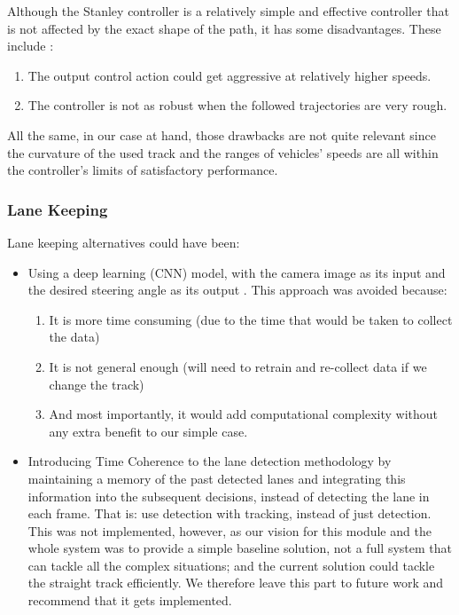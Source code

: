 Although the Stanley controller is a relatively simple and effective controller that is not affected by the exact shape of the path, it has some disadvantages. These include \cite{article}:
\begin{enumerate}
    \item The output control action could get aggressive at relatively higher speeds.
        
    \item The controller is not as robust when the followed trajectories are very rough.
\end{enumerate}

All the same, in our case at hand, those drawbacks are not quite relevant since the curvature of the used track and the ranges of vehicles’ speeds are all within the controller’s limits of satisfactory performance.

\subsubsection{Lane Keeping}
\label{des_lane_keep}
Lane keeping alternatives could have been:

\begin{itemize}
    \item Using a deep learning (CNN) model, with the camera image as its input and the desired steering angle as its output \cite{lane_Deep}. This approach was avoided because:
    \begin{enumerate}
        \item It is more time consuming (due to the time that would be taken to collect the data)
        \item It is not general enough (will need to retrain and re-collect data if we change the track)
        \item And most importantly, it would add computational complexity without any extra benefit to our simple case.
    \end{enumerate}
    
    \item Introducing Time Coherence to the lane detection methodology by maintaining a memory of the past detected lanes and integrating this information into the subsequent decisions, instead of detecting the lane in each frame. That is: use detection with tracking, instead of just detection.\\ This was not implemented, however, as our vision for this module and the whole system was to provide a simple baseline solution, not a full system that can tackle all the complex situations; and the current solution could tackle the straight track efficiently. We therefore leave this part to future work and recommend that it gets implemented.

\end{itemize}






